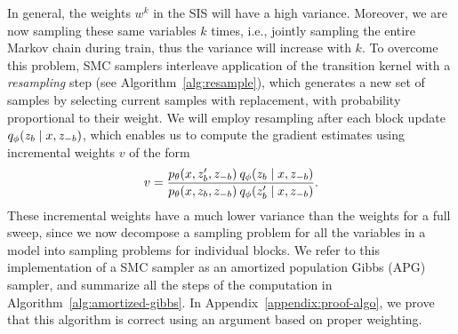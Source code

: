 \documentclass[anonymous=false, %
               format=acmsmall, %
               review=true, %
               screen=true, %
               nonacm=true]{acmart}
\theoremstyle{definition}
\begin{document}
In general, the weights $w^k$ in the SIS will have a high variance. Moreover, we are now sampling these same variables $k$ times, i.e., jointly sampling the entire Markov chain during train, thus the variance will increase with $k$.
To overcome this problem, SMC samplers interleave application of the transition kernel with a \emph{resampling} step (see Algorithm~\ref{alg:resample}), which generates a new set of samples by selecting current samples with replacement, with probability proportional to their weight. 
We will employ resampling after each block update $q_\phi(z_b \mid  x, z_{-b})$, which enables us to compute the gradient estimates using incremental weights $v$ of the form
\begin{align}
    v
    = 
    \frac{p_\theta(x, z'_b, z_{-b}) \: q_\phi(z_b \mid  x, z_{-b})}
         {p_\theta(x, z_b, z_{-b}) \: q_\phi(z'_b \mid  x, z_{-b})}
    .
\end{align}
These incremental weights have a much lower variance than the weights for a full sweep, since we now decompose a sampling problem for all the variables in a model into sampling problems for individual blocks. 
We refer to this implementation of a SMC sampler as an amortized population Gibbs (APG) sampler, and summarize all the steps of the computation in Algorithm~\ref{alg:amortized-gibbs}. In Appendix~\ref{appendix:proof-algo}, we prove that this algorithm is correct using an argument based on proper weighting. 
\end{document}
